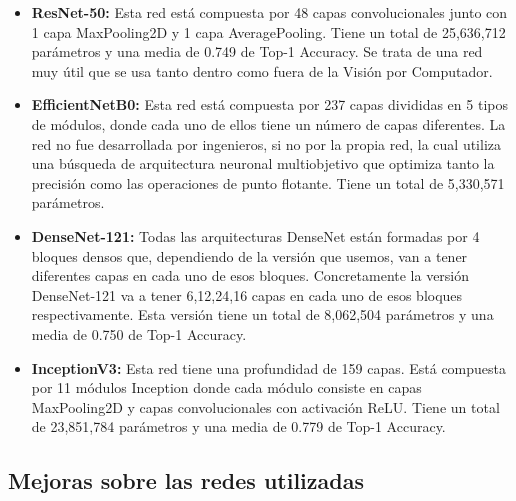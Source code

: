 \begin{itemize}


\item{\textbf{ResNet-50:} Esta red está compuesta por 48 capas convolucionales junto con 1 capa MaxPooling2D y 1 capa AveragePooling. Tiene un total de 25,636,712 parámetros y una media de 0.749 de Top-1 Accuracy. Se trata de una red muy útil que se usa tanto dentro como fuera de la Visión por Computador.}


\item{\textbf{EfficientNetB0:} Esta red está compuesta por 237 capas divididas en 5 tipos de módulos, donde cada uno de ellos tiene un número de capas diferentes. La red no fue desarrollada por ingenieros, si no por la propia red, la cual utiliza una búsqueda de arquitectura neuronal multiobjetivo que optimiza tanto la precisión como las operaciones de punto flotante. Tiene un total de 5,330,571 parámetros.}

\item{\textbf{DenseNet-121:} Todas las arquitecturas DenseNet están formadas por 4 bloques densos que, dependiendo de la versión que usemos, van a tener diferentes capas en cada uno de esos bloques. Concretamente la versión DenseNet-121 va a tener 6,12,24,16 capas en cada uno de esos bloques respectivamente. Esta versión tiene un total de 8,062,504 parámetros y una media de 0.750 de Top-1 Accuracy.}


\item{\textbf{InceptionV3:} Esta red tiene una profundidad de 159 capas. Está compuesta por 11 módulos Inception donde cada módulo consiste en capas MaxPooling2D y capas convolucionales con activación ReLU. Tiene un total de 23,851,784 parámetros y una media de 0.779 de Top-1 Accuracy.}


\end{itemize}

\newpage

\subsection{Mejoras sobre las redes utilizadas}
